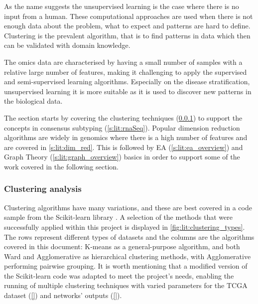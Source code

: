 As the name suggests the unsupervised learning is the case where there is no input from a human. These computational approaches are used when there is not enough data about the problem, what to expect and patterns are hard to define. Clustering is the prevalent algorithm, that is to find patterns in data which then can be validated with domain knowledge. 

The omics data are characterised by having a small number of samples with a relative large number of features, making it challenging to apply the supervised and semi-supervised learning algorithms. Especially on the disease stratification, unsupervised learning it is more suitable as it is used to discover new patterns in the biological data.

The section starts by covering the clustering techniques (\ref{s:lit:clustering}) to support the concepts in consensus subtyping (\ref{s:lit:rnaSeq}). Popular dimension reduction algorithms are widely in genomics where there is a high number of features and are covered in \cref{s:lit:dim_red}. This is followed by EA (\ref{s:lit:ea_overview}) and Graph Theory (\ref{s:lit:graph_overview}) basics in order to support some of the work covered in the following section.

\subsubsection{Clustering analysis} \label{s:lit:clustering}

Clustering algorithms have many variations, and these are best covered in a code sample \cite{Scikit-learn_undated-ax} from the Scikit-learn library \cite{Pedregosa2011-ts}. A selection of the methods that were successfully applied within this project is displayed in \cref{fig:lit:clustering_types}. The rows represent different types of datasets and the columns are the algorithms covered in this document: K-means as a general-purpose algorithm, and both Ward and Agglomerative as hierarchical clustering methods, with Agglomerative performing pairwise grouping. It is worth mentioning that a modified version of the Scikit-learn code was adapted to meet the project's needs, enabling the running of multiple clustering techniques with varied parameters for the TCGA dataset (\ref{}) and networks' outputs (\ref{}).

